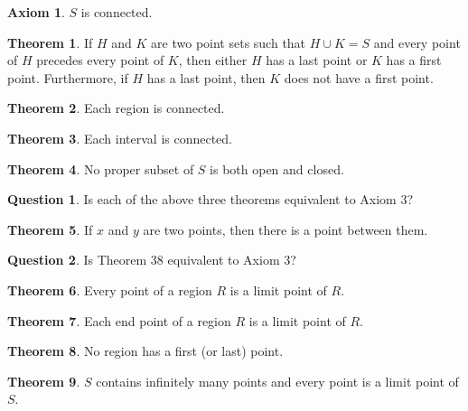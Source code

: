 \documentclass{article}
\theoremstyle{definition}
\newtheorem{question}{Question}
\newtheorem{axiom}{Axiom}
\newtheorem{theorem}{Theorem}
\theoremstyle{definition}
\theoremstyle{plain}
\begin{document}
\begin{axiom}
  \label{ax:connected}
  $S$ is connected.
\end{axiom}

\begin{theorem}
  If $H$ and $K$ are two point sets such that \mbox{$H \cup K =
  S$} and every point of $H$ precedes every point of $K$, then either $H$ has a
  last point or $K$ has a first point.  Furthermore, if $H$ has a last point,
  then $K$ does not have a first point.
\end{theorem}

\begin{theorem}
  Each region is connected.
\end{theorem}

\begin{theorem}
  Each interval is connected.
\end{theorem}

\begin{theorem}
  No proper subset of $S$ is both open and closed.
\end{theorem}

\begin{question}
  Is each of the above three theorems equivalent to Axiom 3?
\end{question}

\begin{theorem}
  If $x$ and $y$ are two points, then there is a point between them.
\end{theorem}

\begin{question}
  Is Theorem 38 equivalent to Axiom 3?
\end{question}

\begin{theorem}
  Every point of a region $R$ is a limit point of $R$.
\end{theorem}

\begin{theorem}
  Each end point of a region $R$ is a limit point of $R$.
\end{theorem}

\begin{theorem}
  No region has a first (or last) point.
\end{theorem}

\begin{theorem}
  $S$ contains infinitely many points and every point is a limit point of $S$.
\end{theorem}
\end{document}
